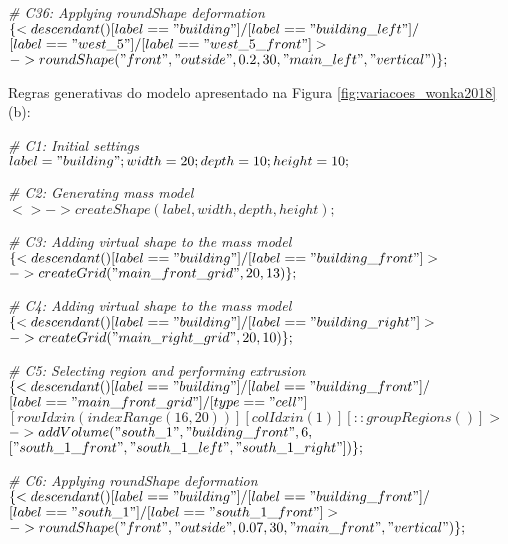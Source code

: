 \noindent \textit{\# C36: Applying roundShape deformation} \\
$\{< descendant() [label=="building"] / [label=="building\_left"] / $\\
$[label=="west\_5"] / [label=="west\_5\_front"] > $\\
$-> roundShape("front", "outside", 0.2, 30, "main\_left", "vertical")\};$

\vspace{1cm}

Regras generativas do modelo apresentado na Figura \ref{fig:variacoes_wonka2018}(b):

\noindent \textit{\# C1: Initial settings}\\
$label = "building"; width = 20; depth = 10; height = 10;$

\noindent \textit{\# C2: Generating mass model}\\
${<> -> createShape(label, width, depth, height)};$

\noindent \textit{\# C3: Adding virtual shape to the mass model}\\
$\{< descendant() [label=="building"] / [label=="building\_front"] > $ \\
$-> createGrid("main\_front\_grid", 20, 13)\};$

\noindent \textit{\# C4: Adding virtual shape to the mass model}\\
$\{< descendant() [label=="building"] / [label=="building\_right"] > $\\
$-> createGrid("main\_right\_grid", 20, 10)\};$

\noindent \textit{\# C5: Selecting region and performing extrusion}\\
$\{< descendant() [label=="building"] / [label=="building\_front"] / $\\
$[label=="main\_front\_grid"] / [type=="cell"] $\\
$[rowIdx in (indexRange(16, 20))] [colIdx in (1)] [::groupRegions()] > $\\
$-> addVolume("south\_1", "building\_front", 6, $\\
$["south\_1\_front", "south\_1\_left", "south\_1\_right"])\};$

\noindent \textit{\# C6: Applying roundShape deformation} \\
$\{< descendant() [label=="building"] / [label=="building\_front"] / $\\
$[label=="south\_1"] / [label=="south\_1\_front"] > $\\
$-> roundShape("front", "outside", 0.07, 30, "main\_front", "vertical")\};$

